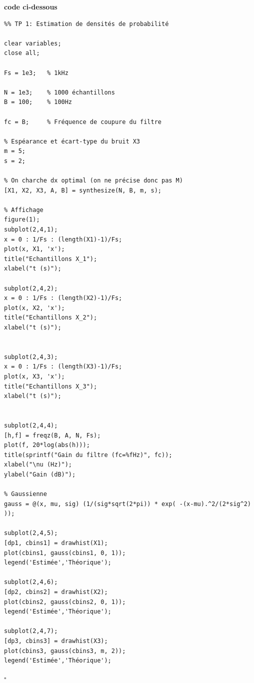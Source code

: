 \documentclass{article}
\newcommand{\debutrep}[1]{\color{blue}\begin{center} \hrulefill \textbf{ #1 } \hrulefill \end{center} }
\newcommand{\finrep}{\vspace*{5mm}\hfill $\square$\color{black}\vspace*{5mm}}
\begin{document}
\debutrep{code ci-dessous}
\begin{verbatim}
%% TP 1: Estimation de densités de probabilité

clear variables;
close all;

Fs = 1e3;   % 1kHz

N = 1e3;    % 1000 échantillons
B = 100;    % 100Hz

fc = B;     % Fréquence de coupure du filtre

% Espéarance et écart-type du bruit X3
m = 5;      
s = 2;

% On charche dx optimal (on ne précise donc pas M)
[X1, X2, X3, A, B] = synthesize(N, B, m, s);

% Affichage
figure(1);
subplot(2,4,1);
x = 0 : 1/Fs : (length(X1)-1)/Fs;
plot(x, X1, 'x');
title("Echantillons X_1");
xlabel("t (s)");

subplot(2,4,2);
x = 0 : 1/Fs : (length(X2)-1)/Fs;
plot(x, X2, 'x');
title("Echantillons X_2");
xlabel("t (s)");


subplot(2,4,3);
x = 0 : 1/Fs : (length(X3)-1)/Fs;
plot(x, X3, 'x');
title("Echantillons X_3");
xlabel("t (s)");


subplot(2,4,4);
[h,f] = freqz(B, A, N, Fs);
plot(f, 20*log(abs(h)));
title(sprintf("Gain du filtre (fc=%fHz)", fc));
xlabel("\nu (Hz)");
ylabel("Gain (dB)");

% Gaussienne
gauss = @(x, mu, sig) (1/(sig*sqrt(2*pi)) * exp( -(x-mu).^2/(2*sig^2) ));

subplot(2,4,5);
[dp1, cbins1] = drawhist(X1);
plot(cbins1, gauss(cbins1, 0, 1));
legend('Estimée','Théorique');

subplot(2,4,6);
[dp2, cbins2] = drawhist(X2);
plot(cbins2, gauss(cbins2, 0, 1));
legend('Estimée','Théorique');

subplot(2,4,7);
[dp3, cbins3] = drawhist(X3);
plot(cbins3, gauss(cbins3, m, 2));
legend('Estimée','Théorique');

\end{verbatim}
\finrep

\newpage
 
\end{document}

